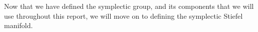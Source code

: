 Now that we have defined the symplectic group, and its components that we will use throughout this report, we will move on to defining the symplectic Stiefel manifold.















